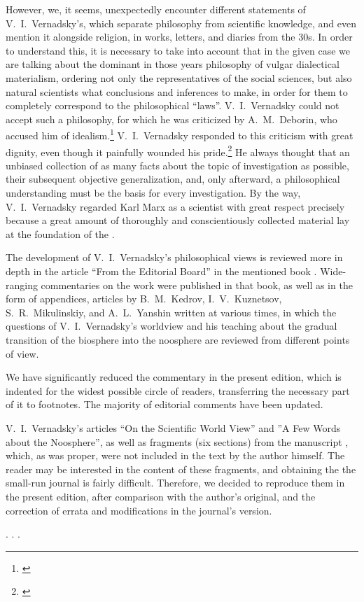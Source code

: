 However, we, it seems, unexpectedly encounter different statements of
V.\ I.\ Vernadsky's, which separate philosophy from scientific knowledge, and
even mention it alongside religion, in works, letters, and diaries from the
30s.  In order to understand this, it is necessary to take into account that in
the given case we are talking about the dominant in those years philosophy of
vulgar dialectical materialism, ordering not only the representatives of the
social sciences, but also natural scientists what conclusions and inferences to
make, in order for them to completely correspond to the philosophical ``laws''.
V.\ I.\ Vernadsky could not accept such a philosophy, for which he was
criticized by A.\ M.\ Deborin, who accused him of
idealism.\footnote{\cite{deborin1932problema}}  V.~I.~Vernadsky responded to
this criticism with great dignity, even though it painfully wounded his
pride.\footnote{\cite{vernadsky1933povodu}}  He always thought that an unbiased
collection of as many facts about the topic of investigation as possible, their
subsequent objective generalization, and, only afterward, a philosophical
understanding must be the basis for every investigation.  By the way,
V.~I.~Vernadsky regarded Karl Marx as a scientist with great respect
precisely because a great amount of thoroughly and conscientiously collected
material lay at the foundation of the
\nocite{marx2007capital-v2,marx2010capital-v3}.

The development of V.\ I.\ Vernadsky's philosophical views is reviewed more in
depth in the article ``From the Editorial Board'' in the mentioned book
.  Wide-ranging commentaries on the work
 were published in that
book, as well as in the form of appendices, articles by B.~M.~Kedrov,
I.~V.~Kuznetsov, S.~R.~Mikulinskiy, and A.~L.~Yanshin written at various times,
in which the questions of V.~I.~Vernadsky's worldview and his teaching about
the gradual transition of the biosphere into the noosphere are reviewed from
different points of view.

We have significantly reduced the commentary in the present edition, which is
indented for the widest possible circle of readers, transferring the necessary
part of it to footnotes.  The majority of editorial comments have been updated.

V.~I.\ Vernadsky's articles ``On the Scientific World View'' and ''A Few Words
about the Noosphere'', as well as fragments (six sections) from the manuscript
, which, as was proper,
were not included in the text by the author himself.  The reader may be
interested in the content of these fragments, and obtaining the the small-run
journal  is fairly difficult.  Therefore, we
decided to reproduce them in the present edition, after comparison with the
author's original, and the correction of errata and modifications in the
journal's version.

. . .
